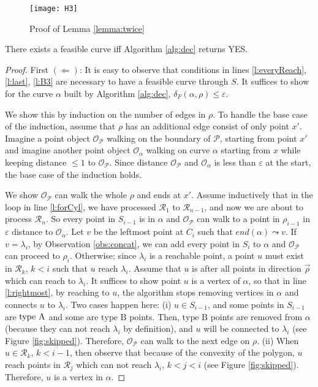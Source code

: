\documentclass[a4paper,UKenglish]{lipics}
\newcommand{\eps}{\varepsilon}
\newcommand{\CR}{{\mathscr R}}
\newcommand{\CO}{{\mathscr O}}
\newcommand{\Pol}{{\mathscr P}}
\newcommand{\R}{\CR}
\newcommand{\distF}{\delta_F}
\newcommand{\Dir}{\overrightarrow}
\newcommand{\pset}{S}
\newcommand{\SemiBad}{\mbox{type B}}
\newcommand{\see}{\leadsto}
\newcommand{\lme}[1]{{\lambda_{#1}}}
\begin{document}
\begin{figure}[t]
	\centering
	\texttt{[image: H3]}
	\caption{Proof of Lemma \ref{lemma:twice}}
	\label{fig:twice}
\end{figure}










\begin{lemma} \label{lemma:last}
There exists a feasible curve iff Algorithm \ref{alg:dec} returns
YES.
\end{lemma}
\begin{proof}
First  $(\Leftarrow)$:
It is easy to observe that 
conditions in lines  
\ref{l:everyReach},
\ref{l:last},
\ref{l:B3} are necessary
to have a feasible curve 
through $\pset$.
It suffices to show for the curve 
$\alpha$ built by Algorithm \ref{alg:dec}, $\distF(\alpha, \rho) \le \eps $.

We show this by induction on the 
number of edges in $\rho$.
To handle the base case of the induction, assume that 
$\rho$ has an additional edge consist 
of only point $x'$.
Imagine a point object $\CO_\Pol$
walking on the boundary of $\Pol$, starting from 
point $x'$ and imagine another point object $\CO_\alpha$
walking on curve $\alpha$ starting from $x$ while 
keeping distance $\le 1$ to  $\CO_\Pol$.
Since distance $\CO_\Pol$ and $\CO_\alpha$ is less 
than $\eps$ at the start,
the base case of the induction holds. 

We show $\CO_\Pol$ can walk the whole $\rho$ 
and ends at $x'$.
Assume inductively that in the loop in line \ref{l:forCyl},
we have processed $\R_1$ to  $\R_{n-1}$, 
and now we are about to process $\R_{n}$.
So every point in $\pset_{i-1}$ is in 
$\alpha$ and $\CO_\Pol$ can walk to a point 
in $\rho_{i-1}$ in $\eps$ distance to $\CO_\alpha$.
Let $v$ be the leftmost point at $C_i$  such that 
$end(\alpha) \see v$.
If $v = \lme{i}$, by Observation \ref{obs:concat}, 
we can add  every point in $\pset_i$ to $\alpha$ 
and $\CO_\Pol$ can proceed to $\rho_i$. Otherwise;
	since $\lme{i}$ is a reachable point, a point 
	$u$ must exist in $\R_k$, $k<i$ such that 
	$u$ reach $\lme{i}$. Assume that 
	$u$ is after all points in direction $\Dir{\rho}$
	which can reach to $\lme{i}$.
	It suffices to show point $u$ is a vertex of $\alpha$, 
	so that in line \ref{l:rightmost}, by reaching to $u$, 
	the algorithm stops removing vertices in $\alpha$
	and connects $u$ to $\lme{i}$.
	Two cases happen here: 
     (i) $u \in \pset_{i-1}$, and  some points in $\pset_{i-1}$ are 
	$\mbox{type A}$ and some are $\SemiBad$ points.
    Then, $\SemiBad$ points are removed 
	from $\alpha$ (because they can not reach $\lme{i}$ by definition), 
	and $u$ will be connected to	$\lambda_i$ (see Figure \ref{fig:skipped}).
	Therefore, $\CO_\Pol$ can walk to the next edge on $\rho$. 
     (ii) When $u \in \R_k$, $k < i-1$, then observe that because of 
the convexity of the polygon, $u$ reach
points in $\R_j$ which can not reach $\lme{i}$, $k<j<i$ (see Figure \ref{fig:skipped}). 
Therefore, $u$ is a vertex in $\alpha$. 


\end{proof}
\end{document}
